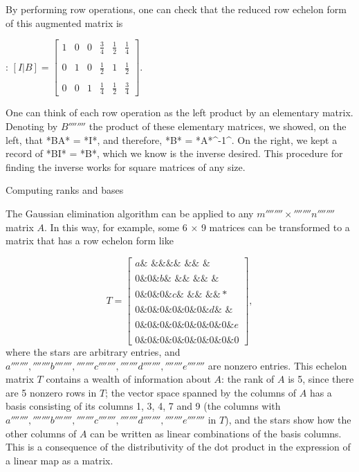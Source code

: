 {{{{{{{{By performing row operations, one can check that the reduced row echelon
form of this augmented matrix is

:   $[ I | B ] = 
     \left[\begin{array}{rrr|rrr}
      1 & 0 & 0 & \frac34 & \frac12 & \frac14 \\\\
            0 & 1 & 0 & \frac12 &      1  & \frac12 \\\\
            0 & 0 & 1 & \frac14 & \frac12 & \frac34
     \end{array}\right].$

One can think of each row operation as the left product by an elementary
matrix. Denoting by $B''''''''$ the product of these
elementary matrices, we showed, on the left, that *BA* = *I*, and
therefore, *B* = *A*^-1^. On the right, we kept a record of *BI* = *B*,
which we know is the inverse desired. This procedure for finding the
inverse works for square matrices of any size.

Computing ranks and bases

The Gaussian elimination algorithm can be applied to any
$m'''''''' × ''''''''n''''''''$ matrix $A$. In
this way, for example, some 6 × 9 matrices can be transformed to a
matrix that has a row echelon form like

$$T=
\begin{bmatrix}
a \& \textit{ \& } \& \textit{\& } \& \textit{ \& } \& \textit{ \& } \\\\
0 \& 0 \& b \& \textit{ \& } \& \textit{ \& } \& \textit{ \& } \\\\
0 \& 0 \& 0 \& c \& \textit{ \& } \& \textit{ \& } \& * \\\\
0 \& 0 \& 0 \& 0 \& 0 \& 0 \& d \& \textit{ \& } \\\\
0 \& 0 \& 0 \& 0 \& 0 \& 0 \& 0 \& 0 \& e \\\\
0 \& 0 \& 0 \& 0 \& 0 \& 0 \& 0 \& 0 \& 0
\end{bmatrix},$$ where the stars are arbitrary entries, and
$a'''''''', ''''''''b'''''''', ''''''''c'''''''', ''''''''d'''''''', ''''''''e''''''''$ are nonzero
entries. This echelon matrix $T$ contains a wealth
of information about $A$: the rank of
$A$ is 5, since there are 5 nonzero rows in
$T$; the vector space spanned by the columns of
$A$ has a basis consisting of its columns 1, 3, 4,
7 and 9 (the columns with
$a'''''''', ''''''''b'''''''', ''''''''c'''''''', ''''''''d'''''''', ''''''''e''''''''$ in
$T$), and the stars show how the other columns of
$A$ can be written as linear combinations of the
basis columns. This is a consequence of the distributivity of the dot
product in the expression of a linear map as a matrix.

}}}}}}}}
